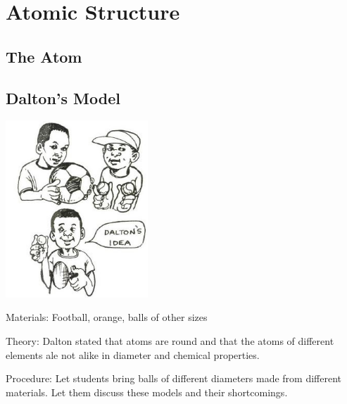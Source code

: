 \section{Atomic Structure} %

\begin{multicols}{2}


\section*{The Atom}


\subsection{Dalton's Model}

\begin{center}
\includegraphics[width=0.4\textwidth]{./img/source/dalton-model.jpg}
\end{center}

\begin{description*}
\item[Materials:]{Football, orange, balls of other sizes}
\item[Theory:]{Dalton stated that atoms are round and
that the atoms of different elements ale not alike
in diameter and chemical properties. }
\item[Procedure:]{Let students bring balls of different diameters
made from different materials. Let them discuss
these models and their shortcomings.}
\end{description*}


\end{multicols}
